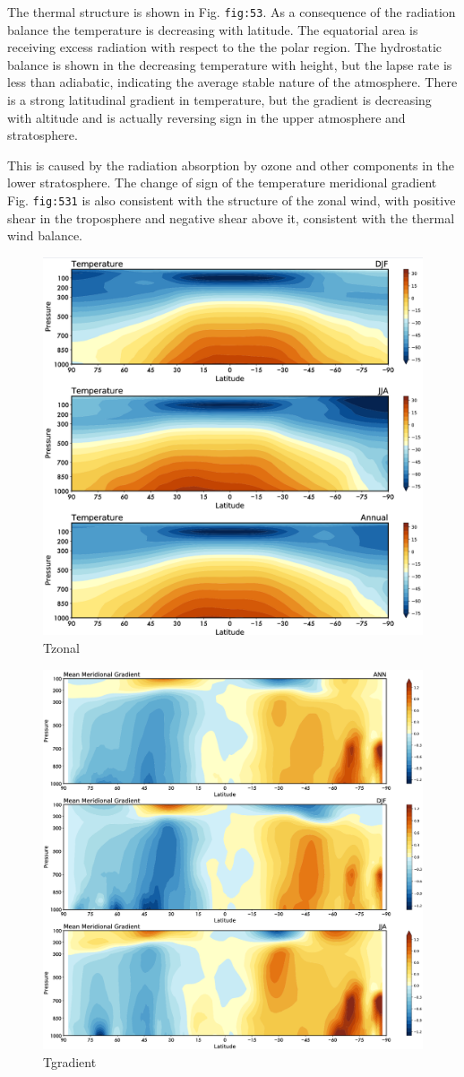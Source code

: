 The thermal structure is shown in Fig. \texttt{fig:53}. As a consequence
of the radiation balance the temperature is decreasing with latitude.
The equatorial area is receiving excess radiation with respect to the
the polar region. The hydrostatic balance is shown in the decreasing
temperature with height, but the lapse rate is less than adiabatic,
indicating the average stable nature of the atmosphere. There is a
strong latitudinal gradient in temperature, but the gradient is
decreasing with altitude and is actually reversing sign in the upper
atmosphere and stratosphere.

This is caused by the radiation absorption by ozone and other components
in the lower stratosphere. The change of sign of the temperature
meridional gradient Fig. \texttt{fig:531} is also consistent with the
structure of the zonal wind, with positive shear in the troposphere and
negative shear above it, consistent with the thermal wind balance.

\begin{figure}[h!]
    \centering
    \includegraphics[width=0.5\linewidth]{uploads/Screenshot 2024-11-19 131634.png}
    \caption{Tzonal}
    \label{fig:enter-label}
\end{figure}
\begin{figure}[h!]
    \centering
    \includegraphics[width=0.5\linewidth]{uploads/Screenshot 2024-11-19 131845.png}
    \caption{Tgradient}
    \label{fig:enter-label}
\end{figure}


